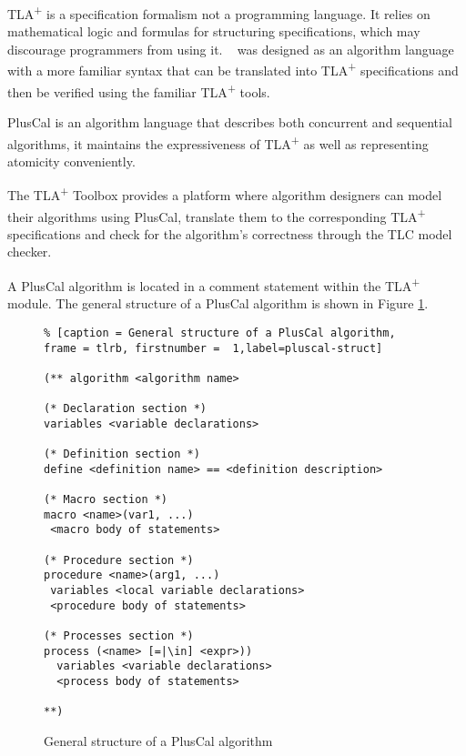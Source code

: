 \documentclass[journal]{IEEEtran}
\newcommand{\tlaplus}{TLA\textsuperscript{+}\xspace}
\begin{document}
\tlaplus is a specification formalism not a programming language. It relies on mathematical logic and formulas for structuring specifications, which may discourage programmers from using it.
\newline
{} ~\cite{pcalAlgo} was designed as an algorithm language with a more familiar syntax that can be translated into \tlaplus specifications and then be verified using the familiar \tlaplus tools.

PlusCal is an algorithm language that describes both concurrent and sequential algorithms, it maintains the expressiveness of \tlaplus as well as representing atomicity conveniently.

The \tlaplus Toolbox provides a platform where algorithm designers can model their algorithms using PlusCal, translate them to the corresponding \tlaplus specifications and check for the algorithm's correctness through the TLC model checker.

A PlusCal algorithm is located in a comment statement within the \tlaplus module. The general structure of a PlusCal algorithm is shown in Figure \ref{pluscal-struct}.

\begin{figure}[!h]
\begin{lstlisting}% [caption = General structure of a PlusCal algorithm, frame = tlrb, firstnumber =  1,label=pluscal-struct]

(** algorithm <algorithm name>

(* Declaration section *)
variables <variable declarations>

(* Definition section *)
define <definition name> == <definition description>

(* Macro section *)
macro <name>(var1, ...)
 <macro body of statements>

(* Procedure section *)
procedure <name>(arg1, ...)
 variables <local variable declarations>
 <procedure body of statements>

(* Processes section *)
process (<name> [=|\in] <expr>))
  variables <variable declarations>
  <process body of statements>

**)

\end{lstlisting}
\caption{General structure of a PlusCal algorithm}
\label{pluscal-struct}
\end{figure}
\end{document}
